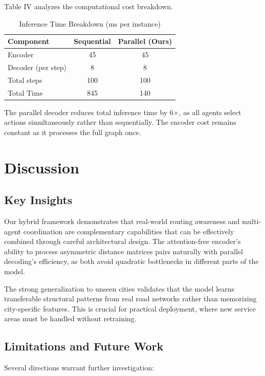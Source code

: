 \documentclass[lettersize,journal]{IEEEtran}
\begin{document}
Table IV analyzes the computational cost breakdown.

\begin{table}[h]
\centering
\caption{Inference Time Breakdown (ms per instance)}
\begin{tabular}{lcc}
\toprule
\textbf{Component} & \textbf{Sequential} & \textbf{Parallel (Ours)} \\
\midrule
Encoder & 45 & 45 \\
Decoder (per step) & 8 & 8 \\
Total steps & 100 & 100 \\
\midrule
Total Time & 845 & 140 \\
\bottomrule
\end{tabular}
\end{table}

The parallel decoder reduces total inference time by 6×, as all agents select actions simultaneously rather than sequentially. The encoder cost remains constant as it processes the full graph once.

\section{Discussion}

\subsection{Key Insights}

Our hybrid framework demonstrates that real-world routing awareness and multi-agent coordination are complementary capabilities that can be effectively combined through careful architectural design. The attention-free encoder's ability to process asymmetric distance matrices pairs naturally with parallel decoding's efficiency, as both avoid quadratic bottlenecks in different parts of the model.

The strong generalization to unseen cities validates that the model learns transferable structural patterns from real road networks rather than memorizing city-specific features. This is crucial for practical deployment, where new service areas must be handled without retraining.

\subsection{Limitations and Future Work}

Several directions warrant further investigation:
\end{document}
